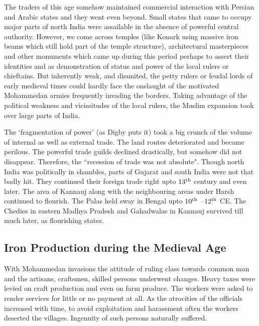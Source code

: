 The traders of this age somehow maintained commercial interaction with Persian and Arabic states and they went even beyond. Small states that came to occupy major parts of north India were assailable in the absence of powerful central authority. However, we come across temples (like Konark using massive iron beams which still hold part of the temple structure), architectural masterpieces and other monuments which came up during this period perhaps to assert their identities and as demonstration of status and power of the local rulers or chieftains. But inherently weak, and disunited, the petty rulers or feudal lords of early medieval times could hardly face the onslaught of the motivated Mohammedan armies frequently invading the borders. Taking advantage of the political weakness and vicissitudes of the local rulers, the Muslim expansion took over large parts of India. 

The `fragmentation of power' (as Digby puts it) took a big crunch of the volume of internal as well as external trade. The land routes deteriorated and became perilous. The powerful trade guilds declined drastically, but somehow did not disappear. Therefore, the ``recession of trade was not absolute". Though north India was politically in shambles, parts of Gujarat and south India were not that badly hit. They continued their foreign trade right upto $13^{\rm th}$ century and even later. The area of Kannauj along with the neighbouring areas under Harsh continued to flourish. The Palas held sway in Bengal upto $10^{\rm th}$ –$12^{\rm th}$ CE. The Chedies in eastern Madhya Pradesh and Gahadwalas in Kannauj survived till much later, as flourishing states.

\vspace{-.3cm}

\subsection*{Iron Production during the Medieval Age}\label{chapter8-subsection-3}

\vspace{-.2cm}

With Mohammedan invasions the attitude of ruling class towards common man and the artisans, craftsmen, skilled persons underwent changes. Heavy taxes were levied on craft production and even on farm produce. The workers were asked to render services for little or no payment at all. As the atrocities of the officials increased with time, to avoid exploitation and harassment often the workers deserted the villages. Ingenuity of such persons naturally suffered. 

